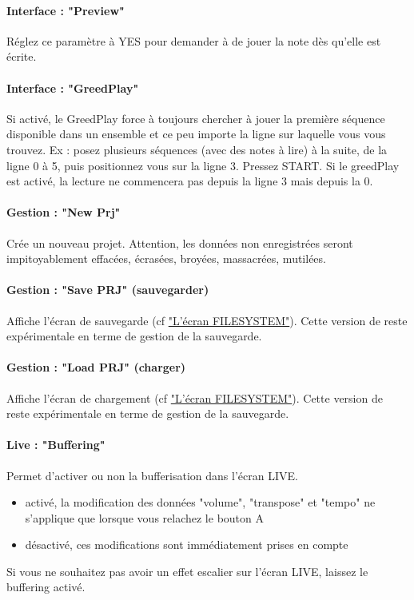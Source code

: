 \paragraph{Interface : "Preview"} Réglez ce paramètre à YES pour demander à \FAT de jouer la note dès qu'elle est écrite.

\paragraph{Interface : "GreedPlay"} Si activé, le GreedPlay force \FAT à toujours chercher à jouer la première séquence
                                    disponible dans un ensemble et ce peu importe la ligne sur laquelle vous vous trouvez.
                                    Ex : posez plusieurs séquences (avec des notes à lire) à la suite, de la ligne 0 à 5, puis positionnez vous sur la ligne 3.
                                    Pressez START. Si le greedPlay est activé, la lecture ne commencera pas depuis la ligne 3 mais depuis la 0.

\paragraph{Gestion : "New Prj"} Crée un nouveau projet.
                                Attention, les données non enregistrées seront impitoyablement effacées, écrasées, broyées, massacrées, mutilées.

\paragraph{Gestion : "Save PRJ" (sauvegarder)}  Affiche l'écran de sauvegarde (cf \hyperref[sec:filesystem]{"L'écran FILESYSTEM"}).
                                                Cette version de \FAT reste expérimentale en terme de gestion de la sauvegarde.

\paragraph{Gestion : "Load PRJ" (charger)} Affiche l'écran de chargement (cf \hyperref[sec:filesystem]{"L'écran FILESYSTEM"}).
                            Cette version de \FAT reste expérimentale en terme de gestion de la sauvegarde.

\paragraph{Live : "Buffering"}
Permet d'activer ou non la bufferisation dans l'écran LIVE.
\medskip

\begin{itemize}
    \item{activé, la modification des données "volume", "transpose" et "tempo" ne s'applique que lorsque vous relachez le bouton A}
    \item{désactivé, ces modifications sont immédiatement prises en compte}
\end{itemize}
\medskip
Si vous ne souhaitez pas avoir un effet escalier sur l'écran LIVE, laissez le buffering activé.
